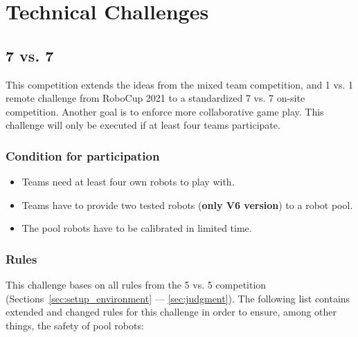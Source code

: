 \section{Technical Challenges}

\subsection{7 vs. 7}
    This competition extends the ideas from the mixed team competition, and 1 vs. 1 remote challenge from RoboCup 2021 to a standardized 7 vs. 7 on-site competition. Another goal is to enforce more collaborative game play. This challenge will only be executed if at least four teams participate.

    \subsubsection{Condition for participation} %
    \label{sec:7vs7:condition_for_participation}
        \begin{itemize}
            \item Teams need at least four own robots to play with. 
            \item Teams have to provide two tested robots (\textbf{only V6 version}) to a robot pool.
            \item The pool robots have to be calibrated in limited time.
        \end{itemize}

    \subsubsection{Rules}
        This challenge bases on all rules from the 5 vs. 5 competition (Sections~\ref{sec:setup_environment} — \ref{sec:judgment}). The following list contains extended and changed rules for this challenge in order to ensure, among other things, the safety of pool robots:

